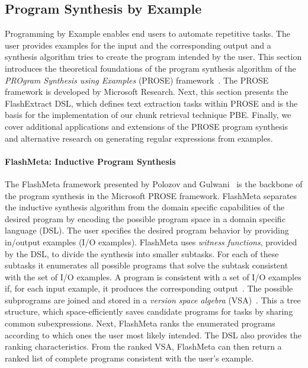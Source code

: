 \documentclass[\myrootdir/main.tex]{subfiles}
\begin{document}

\subsection{Program Synthesis by Example}
\label{sec:rw-prose}
Programming by Example enables end users to automate repetitive tasks.
The user provides examples for the input and the corresponding output and a synthesis algorithm tries to create the program intended by the user.
This section introduces the theoretical foundations of the program synthesis algorithm of the \emph{PROgram Synthesis using Examples} (PROSE) framework~\cite{prose2019webpage}.
The PROSE framework is developed by Microsoft Research.
Next, this section presents the FlashExtract DSL, which defines text extraction tasks within PROSE and is the basis for the implementation of our chunk retrieval technique PBE\@.
Finally, we cover additional applications and extensions of the PROSE program synthesis and alternative research on generating regular expressions from examples.

\paragraph{FlashMeta: Inductive Program Synthesis}
The FlashMeta framework presented by Polozov and Gulwani~\cite{polozov2015flashmeta:} is the backbone of the program synthesis in the Microsoft PROSE framework.
FlashMeta separates the inductive synthesis algorithm from the domain specific capabilities of the desired program by encoding the possible program space in a domain specific language (DSL).
The user specifies the desired program behavior by providing in/output examples (I/O examples).
FlashMeta uses \emph{witness functions}, provided by the DSL, to divide the synthesis into smaller subtasks.
For each of these subtasks it enumerates all possible programs that solve the subtask consistent with the set of I/O examples.
A program is consistent with a set of I/O examples if, for each input example, it produces the corresponding output~\cite{mitchell1982generalization}.
The possible subprograms are joined and stored in a \emph{version space algebra} (VSA)~\cite{mitchell1982generalization}.
This a tree structure, which space-efficiently saves candidate programs for tasks by sharing common subexpressions.
Next, FlashMeta ranks the enumerated programs according to which ones the user most likely intended.
The DSL also provides the ranking characteristics.
From the ranked VSA, FlashMeta can then return a ranked list of complete programs consistent with the user's example.
\end{document}
